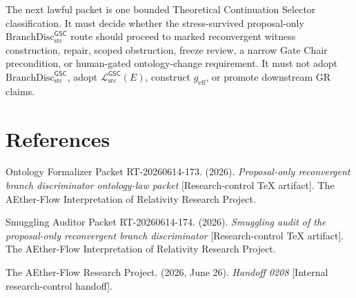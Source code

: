 \documentclass[11pt]{article}
\newcommand{\MetricData}{\mathcal{L}_{\mathrm{src}}^{\mathsf{GSC}}}
\newcommand{\geff}{g_{\mathrm{eff}}}
\newcommand{\BranchDisc}{\mathrm{BranchDisc}_{\mathrm{src}}^{\mathsf{GSC}}}
\begin{document}
The next lawful packet is one bounded Theoretical Continuation Selector
classification. It must decide whether the stress-survived proposal-only
\(\BranchDisc\) route should proceed to marked reconvergent witness
construction, repair, scoped obstruction, freeze review, a narrow Gate Chair
precondition, or human-gated ontology-change requirement. It must not adopt
\(\BranchDisc\), adopt \(\MetricData(E)\), construct \(\geff\), or promote
downstream GR claims.

\section*{References}

Ontology Formalizer Packet RT-20260614-173. (2026). \textit{Proposal-only
reconvergent branch discriminator ontology-law packet} [Research-control TeX
artifact]. The AEther-Flow Interpretation of Relativity Research Project.

Smuggling Auditor Packet RT-20260614-174. (2026). \textit{Smuggling audit of
the proposal-only reconvergent branch discriminator} [Research-control TeX
artifact]. The AEther-Flow Interpretation of Relativity Research Project.

The AEther-Flow Research Project. (2026, June 26). \textit{Handoff 0208}
[Internal research-control handoff].
\end{document}
